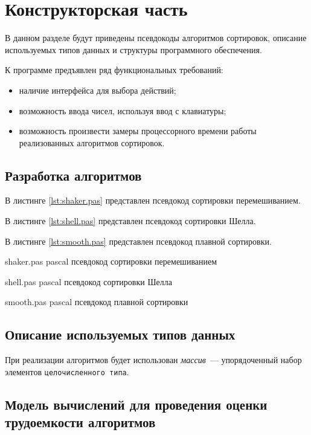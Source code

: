 \chapter{Конструкторская часть}

В данном разделе будут приведены псевдокоды алгоритмов сортировок, описание используемых типов данных и структуры программного обеспечения.

К программе предъявлен ряд функциональных требований:

\begin{itemize}
    \item наличие интерфейса для выбора действий;
    \item возможность ввода чисел, используя ввод с клавиатуры;
    \item возможность произвести замеры процессорного времени работы реализованных алгоритмов сортировок.
\end{itemize}

\section{Разработка алгоритмов}

В листинге \ref{lst:shaker.pas} представлен псевдокод сортировки перемешиванием.

В листинге \ref{lst:shell.pas} представлен псевдокод сортировки Шелла.

В листинге \ref{lst:smooth.pas} представлен псевдокод плавной сортировки.



    {shaker.pas}
    {pascal}
    {псевдокод сортировки перемешиванием}


    {shell.pas}
    {pascal}
    {псевдокод сортировки Шелла}

    {smooth.pas}
    {pascal}
    {псевдокод плавной сортировки}



\section{Описание используемых типов данных}

При реализации алгоритмов будет использован \textit{массив}~--- упорядоченный набор элементов \texttt{целочисленного типа}.

\section{Модель вычислений для проведения оценки трудоемкости алгоритмов}

